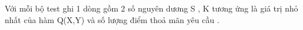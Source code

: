 Với mỗi bộ test ghi 1 dòng gồm 2 số nguyên dương S , K tương ứng là giá trị nhỏ nhất của hàm Q(X,Y) và số lượng điểm thoả mãn yêu cầu .